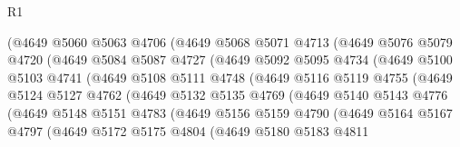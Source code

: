 \begin{lexlean}{R1}
\begin{coremodule}
                  (@4649
                    @5060
                    @5063
                    @4706
                    (@4649
                      @5068
                      @5071
                      @4713
                      (@4649
                        @5076
                        @5079
                        @4720
                        (@4649
                          @5084
                          @5087
                          @4727
                          (@4649
                            @5092
                            @5095
                            @4734
                            (@4649
                              @5100
                              @5103
                              @4741
                              (@4649
                                @5108
                                @5111
                                @4748
                                (@4649
                                  @5116
                                  @5119
                                  @4755
                                  (@4649
                                    @5124
                                    @5127
                                    @4762
                                    (@4649
                                      @5132
                                      @5135
                                      @4769
                                      (@4649
                                        @5140
                                        @5143
                                        @4776
                                        (@4649
                                          @5148
                                          @5151
                                          @4783
                                          (@4649
                                            @5156
                                            @5159
                                            @4790
                                            (@4649
                                              @5164
                                              @5167
                                              @4797
                                              (@4649
                                                @5172
                                                @5175
                                                @4804
                                                (@4649
                                                  @5180
                                                  @5183
                                                  @4811

\end{coremodule}
\end{lexlean}
